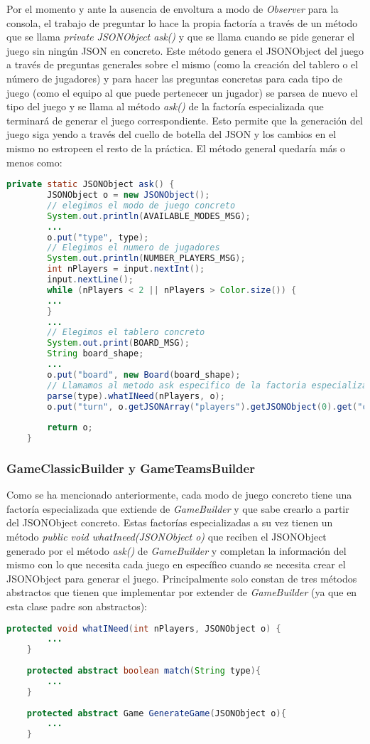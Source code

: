 \documentclass{article}
\begin{document}
Por el momento y ante la ausencia de envoltura a modo de \textit{Observer} para la consola, el trabajo de preguntar lo hace la propia factoría a través de un método que se llama \textit{private JSONObject ask()} y que se llama cuando se pide generar el juego sin ningún JSON en concreto. Este método genera el JSONObject del juego a través de preguntas generales sobre el mismo (como la creación del tablero o el número de jugadores) y para hacer las preguntas concretas para cada tipo de juego (como el equipo al que puede pertenecer un jugador) se parsea de nuevo el tipo del juego y se llama al método \textit{ask()} de la factoría especializada que terminará de generar el juego correspondiente. Esto permite que la generación del juego siga yendo a través del cuello de botella del JSON y los cambios en el mismo no estropeen el resto de la práctica. El método general quedaría más o menos como:
\begin{lstlisting}[language=Java]
	private static JSONObject ask() {
		JSONObject o = new JSONObject();
		// elegimos el modo de juego concreto
		System.out.println(AVAILABLE_MODES_MSG);
		...
		o.put("type", type);
		// Elegimos el numero de jugadores
		System.out.println(NUMBER_PLAYERS_MSG);
		int nPlayers = input.nextInt();
		input.nextLine();
		while (nPlayers < 2 || nPlayers > Color.size()) {
		...
		}
		...
		// Elegimos el tablero concreto
		System.out.print(BOARD_MSG);
		String board_shape;
		...
		o.put("board", new Board(board_shape);
		// Llamamos al metodo ask especifico de la factoria especializada
		parse(type).whatINeed(nPlayers, o);
		o.put("turn", o.getJSONArray("players").getJSONObject(0).get("color"));
		
		return o;
	}
\end{lstlisting}

\subsubsection*{GameClassicBuilder y GameTeamsBuilder}
Como se ha mencionado anteriormente, cada modo de juego concreto tiene una factoría especializada que extiende de \textit{GameBuilder} y que sabe crearlo a partir del JSONObject concreto. Estas factorías especializadas a su vez tienen un método \textit{public void whatIneed(JSONObject o)} que reciben el JSONObject generado por el método \textit{ask()} de \textit{GameBuilder} y completan la información del mismo con lo que necesita cada juego en específico cuando se necesita crear el JSONObject para generar el juego. Principalmente solo constan de tres métodos abstractos que tienen que implementar por extender de \textit{GameBuilder} (ya que en esta clase padre son abstractos):
\begin{lstlisting}[language=Java]
	protected void whatINeed(int nPlayers, JSONObject o) {
		...
	}
	
	protected abstract boolean match(String type){
		...	
	}
	
	protected abstract Game GenerateGame(JSONObject o){
		...
	}
\end{lstlisting}
\end{document}
